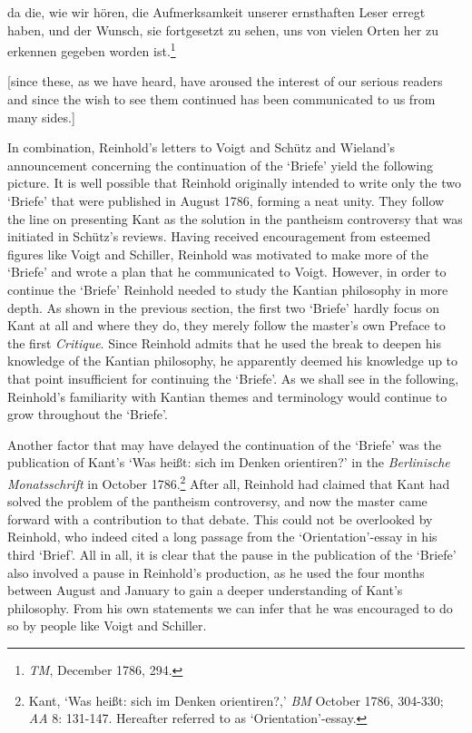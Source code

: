 da die, wie wir h\"{o}ren, die Aufmerksamkeit unserer ernsthaften Leser erregt haben, und der Wunsch, sie fortgesetzt zu sehen, uns von vielen Orten her zu erkennen gegeben worden ist.\footnote{ \textit{TM}, December 1786, 294.} 

[since these, as we have heard, have aroused the interest of our serious readers and since the wish to see them continued has been communicated to us from many sides.]

In combination, Reinhold's letters to Voigt and Sch\"{u}tz and Wieland's announcement concerning the continuation of the `Briefe' yield the following picture. It is well possible that Reinhold originally intended to write only the two `Briefe' that were published in August 1786, forming a neat unity. They follow the line on presenting Kant as the solution in the pantheism controversy that was initiated in Sch\"{u}tz's reviews. Having received encouragement from esteemed figures like Voigt and Schiller, Reinhold was motivated to make more of the `Briefe' and wrote a plan that he communicated to Voigt. However, in order to continue the `Briefe' Reinhold needed to study the Kantian philosophy in more depth. As shown in the previous section, the first two `Briefe' hardly focus on Kant at all and where they do, they merely follow the master's own Preface to the first \textit{Critique}. Since Reinhold admits that he used the break to deepen his knowledge of the Kantian philosophy, he apparently deemed his knowledge up to that point insufficient for continuing the `Briefe'. As we shall see in the following, Reinhold's familiarity with Kantian themes and terminology would continue to grow throughout the `Briefe'.

 Another factor that may have delayed the continuation of the `Briefe' was the publication of Kant's `Was hei\ss{}t: sich im Denken orientiren?' in the \textit{Berlinische Monatsschrift }in October 1786.\footnote{ Kant, `Was hei\ss{}t: sich im Denken orientiren?,' \textit{BM }October 1786, 304{-}330; \textit{AA} 8: 131{-}147. Hereafter referred to as `Orientation'{-}essay. } After all, Reinhold had claimed that Kant had solved the problem of the pantheism controversy, and now the master came forward with a contribution to that debate. This could not be overlooked by Reinhold, who indeed cited a long passage from the `Orientation'{-}essay in his third `Brief'. All in all, it is clear that the pause in the publication of the `Briefe' also involved a pause in Reinhold's production, as he used the four months between August and January to gain a deeper understanding of Kant's philosophy. From his own statements we can infer that he was encouraged to do so by people like Voigt and Schiller. 

